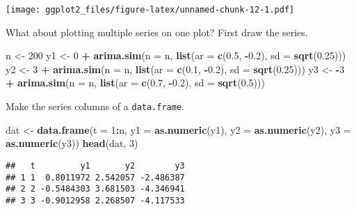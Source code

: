 \documentclass[]{article}
\newenvironment{Shaded}{\begin{snugshade}}{\end{snugshade}}
\newcommand{\KeywordTok}[1]{\textcolor[rgb]{0.13,0.29,0.53}{\textbf{#1}}}
\newcommand{\DataTypeTok}[1]{\textcolor[rgb]{0.13,0.29,0.53}{#1}}
\newcommand{\DecValTok}[1]{\textcolor[rgb]{0.00,0.00,0.81}{#1}}
\newcommand{\FloatTok}[1]{\textcolor[rgb]{0.00,0.00,0.81}{#1}}
\newcommand{\StringTok}[1]{\textcolor[rgb]{0.31,0.60,0.02}{#1}}
\newcommand{\OperatorTok}[1]{\textcolor[rgb]{0.81,0.36,0.00}{\textbf{#1}}}
\newcommand{\NormalTok}[1]{#1}
\begin{document}
\texttt{[image: ggplot2\_files/figure-latex/unnamed-chunk-12-1.pdf]}

What about plotting multiple series on one plot? First draw the series.

\begin{Shaded}
\begin{Highlighting}[]
\NormalTok{n <-}\StringTok{ }\DecValTok{200}
\NormalTok{y1 <-}\StringTok{ }\DecValTok{0} \OperatorTok{+}\StringTok{ }\KeywordTok{arima.sim}\NormalTok{(}\DataTypeTok{n =}\NormalTok{ n, }\KeywordTok{list}\NormalTok{(}\DataTypeTok{ar =} \KeywordTok{c}\NormalTok{(}\FloatTok{0.5}\NormalTok{, }\OperatorTok{-}\FloatTok{0.2}\NormalTok{), }\DataTypeTok{sd =} \KeywordTok{sqrt}\NormalTok{(}\FloatTok{0.25}\NormalTok{)))}
\NormalTok{y2 <-}\StringTok{ }\DecValTok{3} \OperatorTok{+}\StringTok{ }\KeywordTok{arima.sim}\NormalTok{(}\DataTypeTok{n =}\NormalTok{ n, }\KeywordTok{list}\NormalTok{(}\DataTypeTok{ar =} \KeywordTok{c}\NormalTok{(}\FloatTok{0.1}\NormalTok{, }\OperatorTok{-}\FloatTok{0.2}\NormalTok{), }\DataTypeTok{sd =} \KeywordTok{sqrt}\NormalTok{(}\FloatTok{0.25}\NormalTok{)))}
\NormalTok{y3 <-}\StringTok{ }\OperatorTok{-}\DecValTok{3} \OperatorTok{+}\StringTok{ }\KeywordTok{arima.sim}\NormalTok{(}\DataTypeTok{n =}\NormalTok{ n, }\KeywordTok{list}\NormalTok{(}\DataTypeTok{ar =} \KeywordTok{c}\NormalTok{(}\FloatTok{0.7}\NormalTok{, }\OperatorTok{-}\FloatTok{0.2}\NormalTok{), }\DataTypeTok{sd =} \KeywordTok{sqrt}\NormalTok{(}\FloatTok{0.5}\NormalTok{)))}
\end{Highlighting}
\end{Shaded}

Make the series columns of a \texttt{data.frame}.

\begin{Shaded}
\begin{Highlighting}[]
\NormalTok{dat <-}\StringTok{ }\KeywordTok{data.frame}\NormalTok{(}\DataTypeTok{t =} \DecValTok{1}\OperatorTok{:}\NormalTok{n, }\DataTypeTok{y1 =} \KeywordTok{as.numeric}\NormalTok{(y1), }\DataTypeTok{y2 =} \KeywordTok{as.numeric}\NormalTok{(y2), }\DataTypeTok{y3 =} \KeywordTok{as.numeric}\NormalTok{(y3))}
\KeywordTok{head}\NormalTok{(dat, }\DecValTok{3}\NormalTok{)}
\end{Highlighting}
\end{Shaded}

\begin{verbatim}
##   t         y1       y2        y3
## 1 1  0.8011972 2.542057 -2.486387
## 2 2 -0.5484303 3.681503 -4.346941
## 3 3 -0.9012958 2.268507 -4.117533
\end{verbatim}
\end{document}
